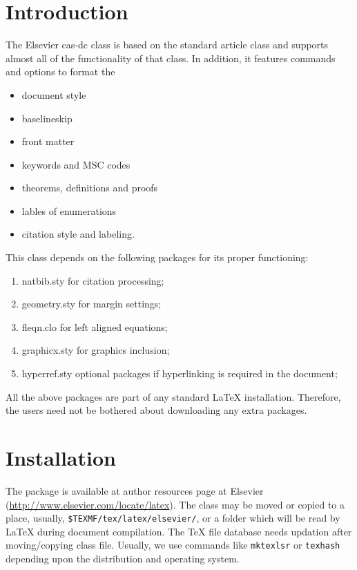 \documentclass[a4paper,fleqn]{cas-dc}
\begin{document}
\maketitle

\section{Introduction}

The Elsevier cas-dc class is based on the
standard article class and supports almost all of the functionality of
that class. In addition, it features commands and options to format the
\begin{itemize} \item document style \item baselineskip \item front
matter \item keywords and MSC codes \item theorems, definitions and
proofs \item lables of enumerations \item citation style and labeling.
\end{itemize}

This class depends on the following packages
for its proper functioning:

\begin{enumerate}
\itemsep=0pt
\item {natbib.sty} for citation processing;
\item {geometry.sty} for margin settings;
\item {fleqn.clo} for left aligned equations;
\item {graphicx.sty} for graphics inclusion;
\item {hyperref.sty} optional packages if hyperlinking is
  required in the document;
\end{enumerate}  

All the above packages are part of any
standard \LaTeX{} installation.
Therefore, the users need not be
bothered about downloading any extra packages.

\section{Installation}

The package is available at author resources page at Elsevier
(\url{http://www.elsevier.com/locate/latex}).
The class may be moved or copied to a place, usually,\linebreak
\verb+$TEXMF/tex/latex/elsevier/+, %
or a folder which will be read                   
by \LaTeX{} during document compilation.  The \TeX{} file
database needs updation after moving/copying class file.  Usually,
we use commands like \verb+mktexlsr+ or \verb+texhash+ depending
upon the distribution and operating system.
\end{document}
